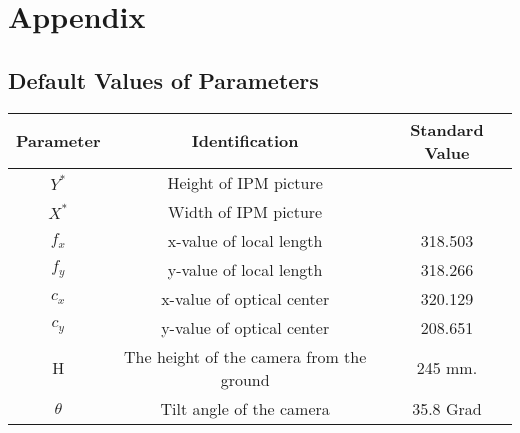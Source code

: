 %
\appendix 
\chapter{Appendix} \label{Appendix}
\section{Default Values of Parameters} 


\begin{center}
  \begin{tabular}{ | c | c | c | }
    \hline
    Parameter & Identification				 			 &  Standard Value   \\ \hline
    $ Y^{*} $ & Height of IPM picture  			    	 &     \\ \hline
    $ X^{*} $ & Width of IPM picture  		  			 &    \\ \hline
    $ f_{x} $ & x-value of local length 			     &  318.503  \\ \hline
    $ f_{y} $ & y-value of local length 			     &  318.266  \\ \hline
    $ c_{x} $ & x-value of optical center			     &  320.129  \\ \hline
    $ c_{y} $ & y-value of optical center	  			 &  208.651  \\ \hline
    H		  & The height of the camera from the ground &  245 mm.  \\ \hline
    $ \theta $& Tilt angle of the camera      			 &  35.8 Grad  \\ \hline
  


  \end{tabular}
  \label{tab:parameters}
\end{center}

%